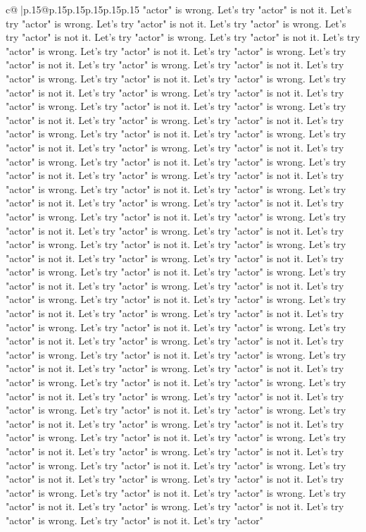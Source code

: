 \documentclass{article}
\begin{document}
{\begin{supertabular}{c@{$\;$}|p{.15\linewidth}@{}p{.15\linewidth}p{.15\linewidth}p{.15\linewidth}p{.15\linewidth}p{.15\linewidth}}
{{{"actor" is wrong. Let's try "actor" is not it. Let's try "actor" is wrong. Let's try "actor" is not it. Let's try "actor" is wrong. Let's try "actor" is not it. Let's try "actor" is wrong. Let's try "actor" is not it. Let's try "actor" is wrong. Let's try "actor" is not it. Let's try "actor" is wrong. Let's try "actor" is not it. Let's try "actor" is wrong. Let's try "actor" is not it. Let's try "actor" is wrong. Let's try "actor" is not it. Let's try "actor" is wrong. Let's try "actor" is not it. Let's try "actor" is wrong. Let's try "actor" is not it. Let's try "actor" is wrong. Let's try "actor" is not it. Let's try "actor" is wrong. Let's try "actor" is not it. Let's try "actor" is wrong. Let's try "actor" is not it. Let's try "actor" is wrong. Let's try "actor" is not it. Let's try "actor" is wrong. Let's try "actor" is not it. Let's try "actor" is wrong. Let's try "actor" is not it. Let's try "actor" is wrong. Let's try "actor" is not it. Let's try "actor" is wrong. Let's try "actor" is not it. Let's try "actor" is wrong. Let's try "actor" is not it. Let's try "actor" is wrong. Let's try "actor" is not it. Let's try "actor" is wrong. Let's try "actor" is not it. Let's try "actor" is wrong. Let's try "actor" is not it. Let's try "actor" is wrong. Let's try "actor" is not it. Let's try "actor" is wrong. Let's try "actor" is not it. Let's try "actor" is wrong. Let's try "actor" is not it. Let's try "actor" is wrong. Let's try "actor" is not it. Let's try "actor" is wrong. Let's try "actor" is not it. Let's try "actor" is wrong. Let's try "actor" is not it. Let's try "actor" is wrong. Let's try "actor" is not it. Let's try "actor" is wrong. Let's try "actor" is not it. Let's try "actor" is wrong. Let's try "actor" is not it. Let's try "actor" is wrong. Let's try "actor" is not it. Let's try "actor" is wrong. Let's try "actor" is not it. Let's try "actor" is wrong. Let's try "actor" is not it. Let's try "actor" is wrong. Let's try "actor" is not it. Let's try "actor" is wrong. Let's try "actor" is not it. Let's try "actor" is wrong. Let's try "actor" is not it. Let's try "actor" is wrong. Let's try "actor" is not it. Let's try "actor" is wrong. Let's try "actor" is not it. Let's try "actor" is wrong. Let's try "actor" is not it. Let's try "actor" is wrong. Let's try "actor" is not it. Let's try "actor" is wrong. Let's try "actor" is not it. Let's try "actor" is wrong. Let's try "actor" is not it. Let's try "actor" is wrong. Let's try "actor" is not it. Let's try "actor" is wrong. Let's try "actor" is not it. Let's try "actor" is wrong. Let's try "actor" is not it. Let's try "actor" is wrong. Let's try "actor" is not it. Let's try "actor" is wrong. Let's try "actor" is not it. Let's try "actor" is wrong. Let's try "actor" is not it. Let's try "actor" is wrong. Let's try "actor" is not it. Let's try "actor" is wrong. Let's try "actor" is not it. Let's try "actor" is wrong. Let's try "actor" is not it. Let's try "actor" is wrong. Let's try "actor" is not it. Let's try "actor" is wrong. Let's try "actor" is not it. Let's try "actor" is wrong. Let's try "actor" is not it. Let's try "actor" is wrong. Let's try "actor" is not it. Let's try "actor" }}}
\end{supertabular}}
\end{document}
